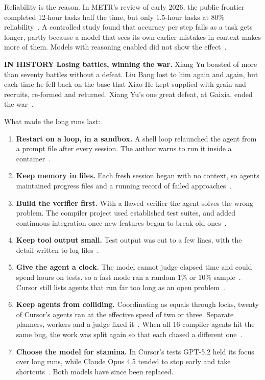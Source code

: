 \documentclass[11pt,letterpaper]{article}
\newcommand{\histlabel}[1]{{\sffamily\fontsize{7.6}{9.6}\selectfont\bfseries\color{muted}IN HISTORY}%
  \enspace\textbf{#1}\enspace}
\begin{document}
Reliability is the reason. In METR's review of early 2026, the public frontier completed
12-hour tasks half the time, but only 1.5-hour tasks at 80\% reliability~\cite{metrrisk}. A
controlled study found that accuracy per step falls as a task gets longer, partly because a
model that sees its own earlier mistakes in context makes more of them. Models with reasoning
enabled did not show the effect~\cite{sinha}.

\begin{history}
\histlabel{Losing battles, winning the war.} Xiang Yu boasted of more than seventy battles
without a defeat. Liu Bang lost to him again and again, but each time he fell back on the base
that Xiao He kept supplied with grain and recruits, re-formed and returned. Xiang Yu's one
great defeat, at Gaixia, ended the war~\cite{shiji}.
\end{history}

What made the long runs last:

\begin{enumerate}[leftmargin=1.5em]
  \item \textbf{Restart on a loop, in a sandbox.} A shell loop relaunched the agent from a
        prompt file after every session. The author warns to run it inside a
        container~\cite{carlini}.
  \item \textbf{Keep memory in files.} Each fresh session began with no context, so agents
        maintained progress files and a running record of failed approaches~\cite{carlini}.
  \item \textbf{Build the verifier first.} With a flawed verifier the agent solves the wrong
        problem. The compiler project used established test suites, and added continuous
        integration once new features began to break old ones~\cite{carlini}.
  \item \textbf{Keep tool output small.} Test output was cut to a few lines, with the detail
        written to log files~\cite{carlini}.
  \item \textbf{Give the agent a clock.} The model cannot judge elapsed time and could spend
        hours on tests, so a fast mode ran a random 1\% or 10\% sample~\cite{carlini}. Cursor
        still lists agents that run far too long as an open problem~\cite{cursor}.
  \item \textbf{Keep agents from colliding.} Coordinating as equals through locks, twenty of
        Cursor's agents ran at the effective speed of two or three. Separate planners, workers
        and a judge fixed it~\cite{cursor}. When all 16 compiler agents hit the same bug, the
        work was split again so that each chased a different one~\cite{carlini}.
  \item \textbf{Choose the model for stamina.} In Cursor's tests GPT-5.2 held its focus over
        long runs, while Claude Opus 4.5 tended to stop early and take
        shortcuts~\cite{cursor}. Both models have since been replaced.
\end{enumerate}
\end{document}
